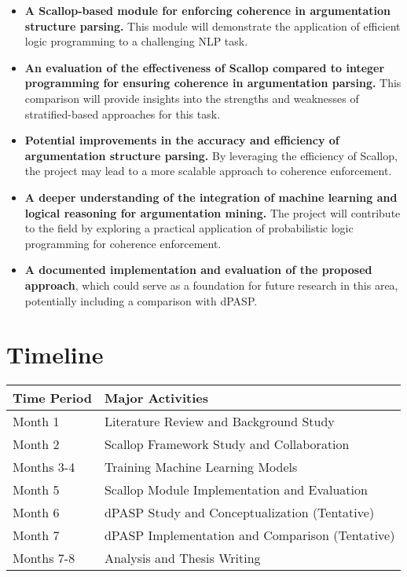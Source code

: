 \documentclass{article}
\begin{document}
\begin{itemize}
    \item \textbf{A Scallop-based module for enforcing coherence in
    argumentation structure parsing.} This module will demonstrate the
    application of efficient logic programming to a challenging NLP task.

    \item \textbf{An evaluation of the effectiveness of Scallop compared to
    integer programming for ensuring coherence in argumentation parsing.} This
    comparison will provide insights into the strengths and weaknesses of
    stratified-based approaches for this task.

    \item \textbf{Potential improvements in the accuracy and efficiency of
    argumentation structure parsing.} By leveraging the efficiency of Scallop,
    the project may lead to a more scalable approach to coherence enforcement.

    \item \textbf{A deeper understanding of the integration of machine learning
    and logical reasoning for argumentation mining.} The project will
    contribute to the field by exploring a practical application of probabilistic
    logic programming for coherence enforcement.

    \item \textbf{A documented implementation and evaluation of the proposed
    approach}, which could serve as a foundation for future research in this
    area, potentially including a comparison with dPASP.
\end{itemize}

\section{Timeline}

\begin{tabular}{|l|l|}
\hline
\textbf{Time Period} & \textbf{Major Activities} \\
\hline
Month 1 & Literature Review and Background Study \\
\hline
Month 2 & Scallop Framework Study and Collaboration \\
\hline
Months 3-4 & Training Machine Learning Models \\
\hline
Month 5 & Scallop Module Implementation and Evaluation \\
\hline
Month 6 & dPASP Study and Conceptualization (Tentative) \\
\hline
Month 7 & dPASP Implementation and Comparison (Tentative) \\
\hline
Months 7-8 & Analysis and Thesis Writing \\
\hline
\end{tabular}
\end{document}
